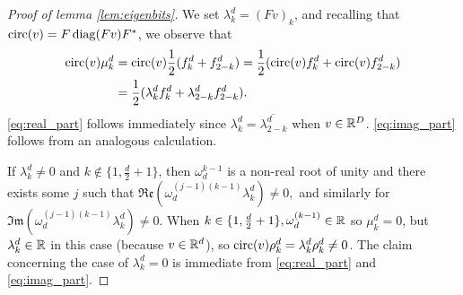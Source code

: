 \begin{proof}[Proof of lemma \ref{lem:eigenbits}]
  We set $\lambda_k^d = (Fv)_k$, and recalling that $\operatorname{circ}(v) = F \operatorname{diag}(F v) F^*$, we observe that \begin{align*}\operatorname{circ}(v) \mu_k^d &= \operatorname{circ}(v) \frac{1}{2} (f_k^d + f_{2 - k}^d) = \frac{1}{2}(\operatorname{circ}(v) f_k^d + \operatorname{circ}(v) f_{2 - k}^d) \\ &= \frac{1}{2}(\lambda_k^d f_k^d + \lambda_{2 - k}^d f_{2 - k}^d).\end{align*}  \eqref{eq:real_part} follows immediately since $\lambda_k^d = \overline{\lambda_{2 - k}^d}$ when $v \in \mathbb{R}^D$.  \eqref{eq:imag_part} follows from an analogous calculation.

  If $\lambda_k^d \neq 0$ and $k \notin \{1, \frac{d}{2} + 1\}$, then $\omega_d^{k - 1}$ is a non-real root of unity and there exists some $j$ such that $\mathfrak{Re}(\omega_d^{(j - 1)(k - 1)} \lambda_k^d) \neq 0,$ and similarly for $\mathfrak{Im}(\omega_d^{(j - 1)(k - 1)} \lambda_k^d) \neq 0.$  When $k \in \{1, \frac{d}{2} + 1\}, \omega_d^{(k - 1)} \in \mathbb{R}$ so $\mu_k^d = 0$, but $\lambda_k^d \in \mathbb{R}$ in this case (because $v \in \mathbb{R}^d$), so $\operatorname{circ}(v) \rho_k^d = \lambda_k^d \rho_k^d \neq 0$.  The claim concerning the case of $\lambda_k^d = 0$ is immediate from \eqref{eq:real_part} and \eqref{eq:imag_part}.
\end{proof}

